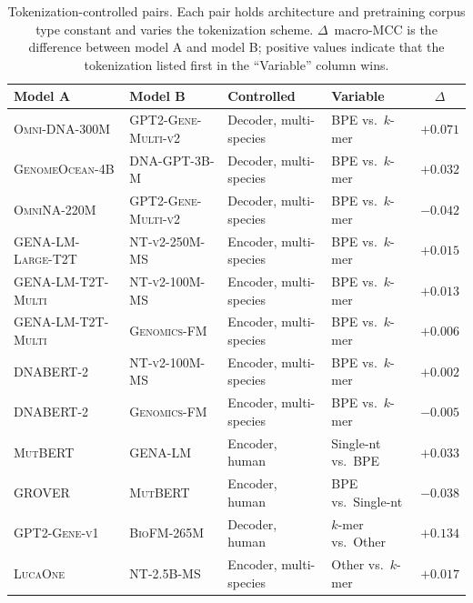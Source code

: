 \documentclass{article}
\theoremstyle{plain}
\theoremstyle{definition}
\theoremstyle{remark}
\begin{document}
\begin{table}[t]
\centering
\caption{Tokenization-controlled pairs. Each pair holds architecture
and pretraining corpus type constant and varies the tokenization
scheme. $\Delta$~macro-MCC is the difference between model A and
model B; positive values indicate that the tokenization listed first
in the ``Variable'' column wins.}
\label{tab:pairs_tokenization}
\small
\begin{tabular}{@{}llllc@{}}
\toprule
\textbf{Model A} & \textbf{Model B} & \textbf{Controlled} & \textbf{Variable} & \textbf{$\Delta$} \\
\midrule
\textsc{Omni-DNA-300M}      & \textsc{GPT2-Gene-Multi-v2} & Decoder, multi-species & BPE vs.\ $k$-mer        & $+0.071$ \\
\textsc{GenomeOcean-4B}     & \textsc{DNA-GPT-3B-M}       & Decoder, multi-species & BPE vs.\ $k$-mer        & $+0.032$ \\
\textsc{OmniNA-220M}        & \textsc{GPT2-Gene-Multi-v2} & Decoder, multi-species & BPE vs.\ $k$-mer        & $-0.042$ \\
\midrule
\textsc{GENA-LM-Large-T2T}  & \textsc{NT-v2-250M-MS}      & Encoder, multi-species & BPE vs.\ $k$-mer        & $+0.015$ \\
\textsc{GENA-LM-T2T-Multi}  & \textsc{NT-v2-100M-MS}      & Encoder, multi-species & BPE vs.\ $k$-mer        & $+0.013$ \\
\textsc{GENA-LM-T2T-Multi}  & \textsc{Genomics-FM}        & Encoder, multi-species & BPE vs.\ $k$-mer        & $+0.006$ \\
\textsc{DNABERT-2}          & \textsc{NT-v2-100M-MS}      & Encoder, multi-species & BPE vs.\ $k$-mer        & $+0.002$ \\
\textsc{DNABERT-2}          & \textsc{Genomics-FM}        & Encoder, multi-species & BPE vs.\ $k$-mer        & $-0.005$ \\
\midrule
\textsc{MutBERT}            & \textsc{GENA-LM}            & Encoder, human         & Single-nt vs.\ BPE      & $+0.033$ \\
\textsc{GROVER}             & \textsc{MutBERT}            & Encoder, human         & BPE vs.\ Single-nt      & $-0.038$ \\
\midrule
\textsc{GPT2-Gene-v1}       & \textsc{BioFM-265M}         & Decoder, human         & $k$-mer vs.\ Other      & $+0.134$ \\
\textsc{LucaOne}            & \textsc{NT-2.5B-MS}         & Encoder, multi-species & Other vs.\ $k$-mer      & $+0.017$ \\
\bottomrule
\end{tabular}
\end{table}
\end{document}
